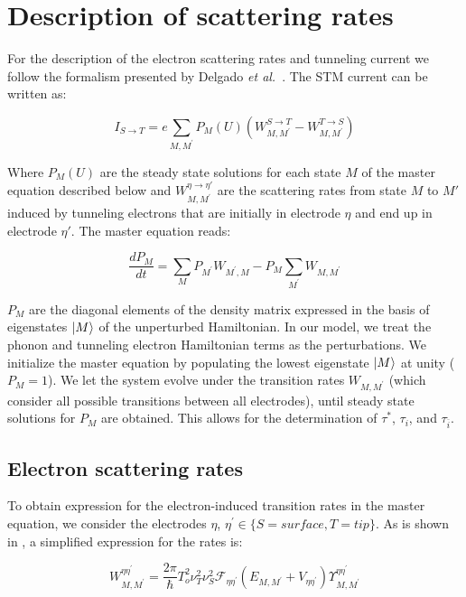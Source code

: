 \documentclass[reprint,amsmath,amssymb,aps,nofootinbib,onecolumn]{revtex4-2}
\begin{document}
\section{Description of scattering rates}
For the description of the electron scattering rates and tunneling current we follow the formalism presented by Delgado \textit{et al.}~\cite{delgado2010}. The STM current can be written as:

\begin{equation}
I_{S\rightarrow T} = e \sum_{M,M^{\prime}}P_M(U)\left(W_{M,M^{\prime}}^{S\rightarrow T}-W_{M,M^{\prime}}^{T\rightarrow S}\right)
\label{eq:stm_curr}
\end{equation}

Where $P_M(U)$ are the steady state solutions for each state $M$ of the master equation described below and $W_{M,M^{\prime}}^{\eta \rightarrow \eta'}$ are the scattering rates from state $M$ to $M'$ induced by tunneling electrons that are initially in electrode $\eta$ and end up in electrode $\eta'$. The master equation reads:

\begin{equation}
\dfrac{dP_M}{dt}=\sum_M P_{M^{\prime}}W_{M^{\prime},M} - P_M\sum_{M^{\prime}}W_{M,M^{\prime}}
\end{equation}

$P_M$ are the diagonal elements of the density matrix expressed in the basis of eigenstates $\ket{M}$ of the unperturbed Hamiltonian. In our model, we treat the phonon and tunneling electron Hamiltonian terms as the perturbations. We initialize the master equation by populating the lowest eigenstate $\ket{M}$ at unity ($P_M = 1$). We let the system evolve under the transition rates $W_{M,M^{\prime}}$ (which consider all possible transitions between all electrodes), until steady state solutions for $P_M$ are obtained. This allows for the determination of $\tau^{*}$, $\tau_i$, and $\tau_{\overline{i}}$. 

\subsection{Electron scattering rates}
To obtain expression for the electron-induced transition rates in the master equation, we consider the electrodes $\eta$, $\eta^{\prime} \in\lbrace S=surface, T=tip\rbrace$. As is shown in \cite{delgado2010}, a simplified expression for the rates is:

\begin{equation}
W_{M,M^{\prime}}^{\eta \eta^{\prime}}=\frac{2 \pi}{\hbar} T_o^2 \nu_T^2 \nu_S^2 \mathcal{F}_{\eta\eta^{\prime}}(E_{M,M^{\prime}} + V_{\eta \eta^{\prime}})\Upsilon^{\eta\eta^{\prime}}_{M,M^{\prime}}
\label{eq:scatt_rates}
\end{equation}
\end{document}
